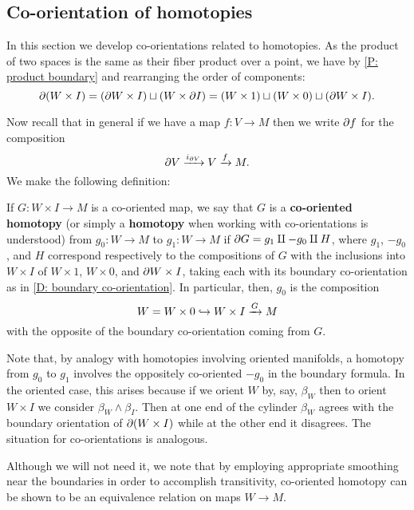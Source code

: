 \subsection{Co-orientation of homotopies}\label{S: co-oriented homotopy}

In this section we develop co-orientations related to homotopies.
As the product of two spaces is the same as their fiber product over a point, we have by \cref{P: product boundary} and rearranging the order of components:
\begin{equation*}
	\partial(W \times I) =
	(\partial W \times I) \sqcup (W \times \partial I) =
	(W \times 1) \sqcup (W \times 0) \sqcup (\partial W \times I).
\end{equation*}

Now recall that in general if we have a map $f \colon V \to M$ then we write $\partial f$ for the composition
$$\partial V \xrightarrow{i_{\partial V}} V \xrightarrow{f} M.$$
We make the following definition:

\begin{definition}\label{D: co-oriented homotopy}
	If $G \colon W \times I \to M$ is a co-oriented map, we say that $G$ is a \textbf{co-oriented homotopy} (or simply a \textbf{homotopy} when working with co-orientations is understood) from $g_0 \colon W \to M$ to $g_1 \colon W \to M$ if $\partial G = g_1 \amalg -g_0\amalg H$, where $g_1$, $-g_0$, and $H$ correspond respectively to the compositions of $G$ with the inclusions into $W \times I$ of $W \times 1$, $W \times 0$, and $\partial W \times I$, taking each with its boundary co-orientation as in \cref{D: boundary co-orientation}.
	In particular, then, $g_0$ is the composition
	$$W=W \times 0 \hookrightarrow W \times I \xrightarrow{G} M$$
	with the opposite of the boundary co-orientation coming from $G$.
\end{definition}

Note that, by analogy with homotopies involving oriented manifolds, a homotopy from $g_0$ to $g_1$ involves the oppositely co-oriented $-g_0$ in the boundary formula.
In the oriented case, this arises because if we orient $W$ by, say, $\beta_W$ then to orient $W \times I$ we consider $\beta_W \wedge \beta_I$.
Then at one end of the cylinder $\beta_W$ agrees with the boundary orientation of $\partial (W \times I)$ while at the other end it disagrees.
The situation for co-orientations is analogous.

Although we will not need it, we note that by employing appropriate smoothing near the boundaries in order to accomplish transitivity, co-oriented homotopy can be shown to be an equivalence relation on maps $W \to M$.

